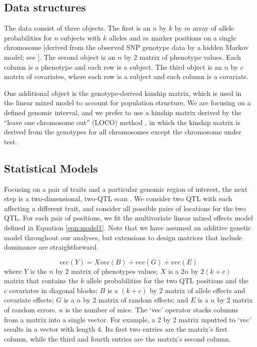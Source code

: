 \documentclass{book}
\begin{document}
\subsection{Data structures}

The data consist of three objects. The first is an $n$ by $k$ by $m$
array of allele probabilities for $n$ subjects with $k$ alleles and
$m$ marker positions on a single chromosome [derived from the observed
SNP genotype data by a hidden Markov model; see
\citet{broman2019rqtl2}]. The second object is an $n$ by 2 matrix of
phenotype values. Each column is a phenotype and each row is a
subject. The third object is an $n$ by $c$ matrix of covariates, where
each row is a subject and each column is a covariate.

One additional object is the genotype-derived kinship matrix, which is
used in the linear mixed model to account for population structure. We
are focusing on a defined genomic interval, and we prefer to use a
kinship matrix derived by the ``leave one chromosome out'' (LOCO)
method \citep{yang2014advantages}, in which the kinship matrix is
derived from the genotypes for all chromosomes except the chromosome
under test.




\subsection{Statistical Models}

Focusing on a pair of traits and a particular genomic region of
interest, the next step is a two-dimensional, two-QTL
scan \citep{jiang1995multiple}. We consider two QTL with each
affecting a different trait, and consider all possible pairs of
locations for the two QTL. For each pair of positions, we fit
the multivariate linear mixed effects model defined in Equation
\ref{eqn:model1}. Note that we have
assumed an additive genetic model throughout our analyses, but
extensions to design matrices that include dominance are
straightforward.


\begin{equation}
vec(Y) = X vec(B) + vec(G) + vec(E)
\label{eqn:model1}
\end{equation}
where $Y$ is the $n$ by $2$ matrix of phenotypes values;
$X$ is a $2n$ by $2(k + c)$
matrix that contains the $k$ allele probabilities for the two QTL
positions and the $c$
covariates in diagonal blocks; $B$ is a $(k + c)$ by $2$ matrix of
allele effects and covariate effects; $G$ is a $n$ by $2$ matrix of
random effects; and $E$ is a $n$ by $2$ matrix of random errors. $n$
is the number of mice. The `vec' operator stacks columns from a matrix
into a single vector. For example, a 2 by 2 matrix inputted to `vec'
results in a vector with length 4. Its first two entries are the
matrix's first column, while the third and fourth entries are the
matrix's second column.
\end{document}

